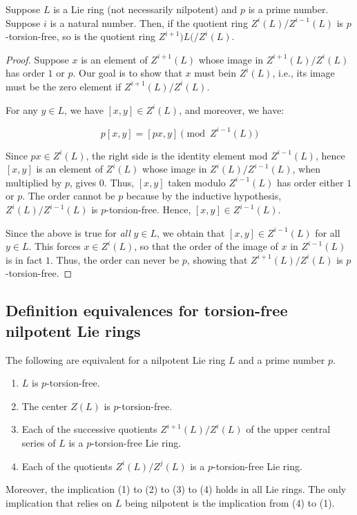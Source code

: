 \documentclass{ucetd}
\begin{document}
\begin{lemma}\label{ucs-torsion-free-lie}
  Suppose $L$ is a Lie ring (not necessarily nilpotent) and $p$ is a
  prime number. Suppose $i$ is a natural number. Then, if the quotient
  ring $Z^i(L)/Z^{i-1}(L)$ is $p$-torsion-free, so is the quotient
  ring $Z^{i+1})L(/Z^i(L)$.
\end{lemma}

\begin{proof}
  Suppose $x$ is an element of $Z^{i+1}(L)$ whose image in
  $Z^{i+1}(L)/Z^i(L)$ has order $1$ or $p$. Our goal is to show that
  $x$ must bein $Z^i(L)$, i.e., its image must be the zero element if
  $Z^{i+1}(L)/Z^i(L)$.

  For any $y \in L$, we have $[x,y] \in Z^i(L)$, and moreover, we
  have:

  $$p[x,y] = [px,y] \pmod{Z^{i-1}(L)}$$

  Since $px \in Z^i(L)$, the right side is the identity element mod
  $Z^{i-1}(L)$, hence $[x,y]$ is an element of $Z^i(L)$ whose image in
  $Z^i(L)/Z^{i-1}(L)$, when multiplied by $p$, gives $0$. Thus,
  $[x,y]$ taken modulo $Z^{i-1}(L)$ has order either $1$ or $p$. The
  order cannot be $p$ because by the inductive hypothesis,
  $Z^i(L)/Z^{i-1}(L)$ is $p$-torsion-free. Hence, $[x,y] \in
  Z^{i-1}(L)$.

  Since the above is true for {\em all} $y \in L$, we obtain that
  $[x,y] \in Z^{i-1}(L)$ for all $y \in L$. This forces $x \in
  Z^i(L)$, so that the order of the image of $x$ in $Z^{i-1}(L)$ is in
  fact $1$. Thus, the order can never be $p$, showing that
  $Z^{i+1}(L)/Z^i(L)$ is $p$-torsion-free.
\end{proof}

\subsection{Definition equivalences for torsion-free nilpotent Lie rings}

\begin{theorem}\label{thm:torsion-free-equivalence-theorem-lie}
  The following are equivalent for a nilpotent Lie ring $L$ and a prime
  number $p$.

  \begin{enumerate}
  \item $L$ is $p$-torsion-free.
  \item The center $Z(L)$ is $p$-torsion-free.
  \item Each of the successive quotients $Z^{i+1}(L)/Z^i(L)$ of the
    upper central series of $L$ is a $p$-torsion-free Lie ring.
  \item Each of the quotients $Z^i(L)/Z^j(L)$ is a $p$-torsion-free Lie ring.
  \end{enumerate}

  Moreover, the implication (1) to (2) to (3) to (4) holds in
  all Lie rings. The only implication that relies on $L$ being nilpotent
  is the implication from (4) to (1).
\end{theorem}
\end{document}
